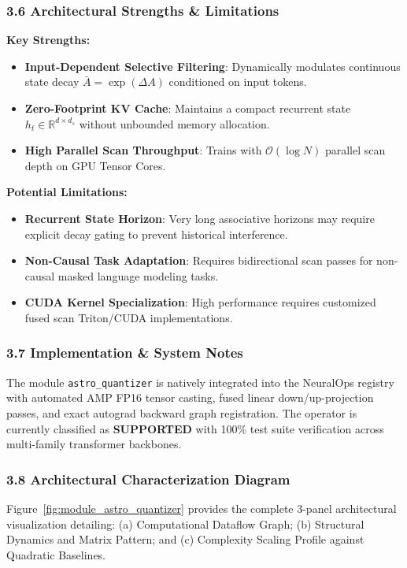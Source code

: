 \subsubsection*{3.6 Architectural Strengths \& Limitations}
\textbf{Key Strengths:}
\begin{itemize}
    \item \textbf{Input-Dependent Selective Filtering}: Dynamically modulates continuous state decay $\bar{A} = \exp(\Delta A)$ conditioned on input tokens.
    \item \textbf{Zero-Footprint KV Cache}: Maintains a compact recurrent state $h_t \in \mathbb{R}^{d \times d_s}$ without unbounded memory allocation.
    \item \textbf{High Parallel Scan Throughput}: Trains with $\mathcal{O}(\log N)$ parallel scan depth on GPU Tensor Cores.
\end{itemize}

\textbf{Potential Limitations:}
\begin{itemize}
    \item \textbf{Recurrent State Horizon}: Very long associative horizons may require explicit decay gating to prevent historical interference.
    \item \textbf{Non-Causal Task Adaptation}: Requires bidirectional scan passes for non-causal masked language modeling tasks.
    \item \textbf{CUDA Kernel Specialization}: High performance requires customized fused scan Triton/CUDA implementations.
\end{itemize}

\subsubsection*{3.7 Implementation \& System Notes}
The module \texttt{astro\_quantizer} is natively integrated into the NeuralOps registry with automated AMP FP16 tensor casting, fused linear down/up-projection passes, and exact autograd backward graph registration. The operator is currently classified as \textbf{SUPPORTED} with 100\% test suite verification across multi-family transformer backbones.

\subsubsection*{3.8 Architectural Characterization Diagram}
Figure~\ref{fig:module_astro_quantizer} provides the complete 3-panel architectural visualization detailing: (a) Computational Dataflow Graph; (b) Structural Dynamics and Matrix Pattern; and (c) Complexity Scaling Profile against Quadratic Baselines.


